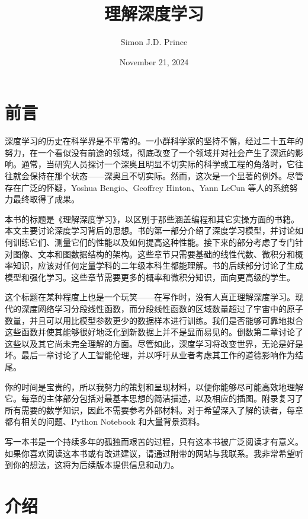 \documentclass[lang=cn,newtx,10pt,scheme=chinese]{elegantbook}
\title{理解深度学习}
\author{Simon J.D. Prince}
\date{November 21, 2024}
\begin{document}
\maketitle
\frontmatter

\tableofcontents

\chapter{前言}

深度学习的历史在科学界是不平常的。一小群科学家的坚持不懈，经过二十五年的努力，在一个看似没有前途的领域，彻底改变了一个领域并对社会产生了深远的影响。通常，当研究人员探讨一个深奥且明显不切实际的科学或工程的角落时，它往往就会保持在那个状态——深奥且不切实际。然而，这次是一个显著的例外。尽管存在广泛的怀疑，Yoshua Bengio、Geoffrey Hinton、Yann LeCun 等人的系统努力最终取得了成果。

本书的标题是《理解深度学习》，以区别于那些涵盖编程和其它实操方面的书籍。本文主要讨论深度学习背后的思想。书的第一部分介绍了深度学习模型，并讨论如何训练它们、测量它们的性能以及如何提高这种性能。接下来的部分考虑了专门针对图像、文本和图数据结构的架构。这些章节只需要基础的线性代数、微积分和概率知识，应该对任何定量学科的二年级本科生都能理解。书的后续部分讨论了生成模型和强化学习。这些章节需要更多的概率和微积分知识，面向更高级的学生。

这个标题在某种程度上也是一个玩笑——在写作时，没有人真正理解深度学习。现代的深度网络学习分段线性函数，而分段线性函数的区域数量超过了宇宙中的原子数量，并且可以用比模型参数更少的数据样本进行训练。我们是否能够可靠地拟合这些函数并使其能够很好地泛化到新数据上并不是显而易见的。倒数第二章讨论了这些以及其它尚未完全理解的方面。尽管如此，深度学习将改变世界，无论是好是坏。最后一章讨论了人工智能伦理，并以呼吁从业者考虑其工作的道德影响作为结尾。

你的时间是宝贵的，所以我努力的策划和呈现材料，以便你能够尽可能高效地理解它。每章的主体部分包括对最基本思想的简洁描述，以及相应的插图。附录复习了所有需要的数学知识，因此不需要参考外部材料。对于希望深入了解的读者，每章都有相关的问题、Python Notebook 和大量背景资料。

写一本书是一个持续多年的孤独而艰苦的过程，只有这本书被广泛阅读才有意义。如果你喜欢阅读这本书或有改进建议，请通过附带的网站与我联系。我非常希望听到你的想法，这将为后续版本提供信息和动力。

\mainmatter

\chapter{介绍}
\end{document}
